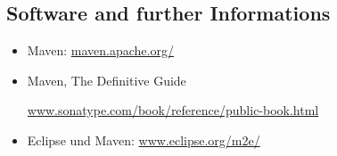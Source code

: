 \subsection{Software and further Informations}
\begin{itemize}
\item Maven: \href{http://maven.apache.org/}{maven.apache.org/}
\item Maven, The Definitive Guide

\href{http://www.sonatype.com/book/reference/public-book.html}
{www.sonatype.com/book/reference/public-book.html}

\item Eclipse und Maven:
  \href{http://www.eclipse.org/m2e/}{www.eclipse.org/m2e/}
%
%
%
%
%
%
%
%
%
%
%
%
%
%
%
\end{itemize}

\newpage
